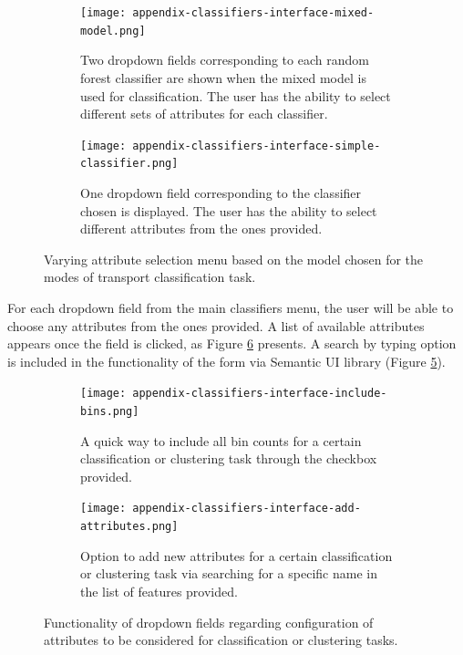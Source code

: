 \documentclass[bsc,frontabs,twoside,singlespacing, parskip,deptreport]{infthesis}     %
\begin{document}
\begin{appendices}
\begin{figure}[h!]
  \begin{subfigure}[t]{\textwidth}
    \texttt{[image: appendix-classifiers-interface-mixed-model.png]}
    \caption{Two dropdown fields corresponding to each random forest classifier are shown when the mixed model is used for classification. The user has the ability to select different sets of attributes for each classifier.}
    \label{fig:mixed-model-interface}
  \end{subfigure}
  \hfill
  \begin{subfigure}[t]{\textwidth}
    \texttt{[image: appendix-classifiers-interface-simple-classifier.png]}
    \caption{One dropdown field corresponding to the classifier chosen is displayed. The user has the ability to select different attributes from the ones provided.}
    \label{fig:simple-classifier-interface}
  \end{subfigure}
  \caption{Varying attribute selection menu based on the model chosen for the modes of transport classification task.}
  \label{fig:classification-interface}
\end{figure}

For each dropdown field from the main classifiers menu, the user will be able to choose any attributes from the ones provided. A list of available attributes appears once the field is clicked, as Figure \ref{fig:attributes-interface} presents. A search by typing option is included in the functionality of the form via Semantic UI library (Figure \ref{fig:add-attributes-interface}).

\begin{figure}[h!]
  \begin{subfigure}[t]{\textwidth}
    \texttt{[image: appendix-classifiers-interface-include-bins.png]}
    \caption{A quick way to include all bin counts for a certain classification or clustering task through the checkbox provided.}
    \label{fig:include-bins-interface}
  \end{subfigure}
  \hfill
  \begin{subfigure}[t]{\textwidth}
    \texttt{[image: appendix-classifiers-interface-add-attributes.png]}
    \caption{Option to add new attributes for a certain classification or clustering task via searching for a specific name in the list of features provided.}
    \label{fig:add-attributes-interface}
  \end{subfigure}
  \caption{Functionality of dropdown fields regarding configuration of attributes to be considered for classification or clustering tasks.}
  \label{fig:attributes-interface}
\end{figure}


\end{appendices}
\end{document}
